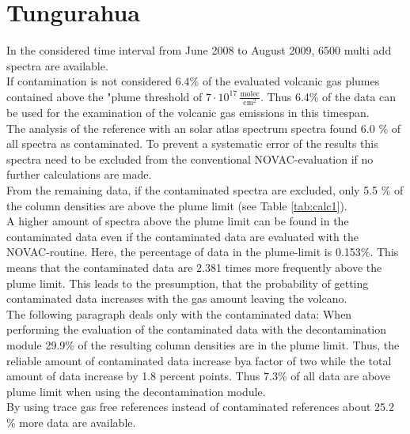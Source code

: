 \documentclass  [
  paper    = a4,
  BCOR     = 10mm,
  twoside,
  fontsize = 12pt,
  fleqn,
  toc      = bibnumbered,
  toc      = listofnumbered,
  numbers  = noendperiod,
  headings = normal,
  listof   = leveldown,
  version  = 3.03
]                                       {scrreprt}
\begin{document}
\section{Tungurahua}
	In the considered time interval from June 2008 to August 2009, 6500 multi add spectra are available. \\
	If contamination is not considered
	6.4\% of the evaluated volcanic gas plumes contained  above the "plume threshold of $7\cdot10^{17}\,\frac{\text{molec}}{\text{cm}^2}$. Thus 6.4\% of the data can be used for the examination of the volcanic gas emissions in this timespan.\\
 	The analysis of the reference with an solar atlas spectrum spectra found 6.0 \% of all spectra as contaminated. To prevent a systematic error of the results this spectra need to be excluded from the conventional NOVAC-evaluation if no further calculations are made.\\
 	From the remaining data,  if the contaminated spectra are excluded, only 5.5 \% of the   column densities are above the plume limit  (see  Table \ref{tab:calc1}). \\
 	A higher amount of spectra above the   plume limit can be found in the contaminated data even if the contaminated data are evaluated with the NOVAC-routine. Here, the percentage of data in the plume-limit is 0.153\%.
 	This means that the contaminated data are 2.381 times more frequently above the plume limit. This leads to the presumption, that the probability of getting contaminated data increases with the gas amount leaving the volcano.\\
 	The following paragraph deals only with the contaminated data:	
 	When performing the evaluation of the contaminated data with the decontamination module 29.9\% of the resulting   column densities are in the plume limit. Thus, the reliable amount of contaminated data increase bya factor of two while the total amount of data increase by 1.8 percent points. Thus 7.3\% of all data are above plume limit when using the decontamination module.\\
 	By using trace gas free references instead of contaminated references about 25.2 \% more data are available. \\

	
\end{document}
